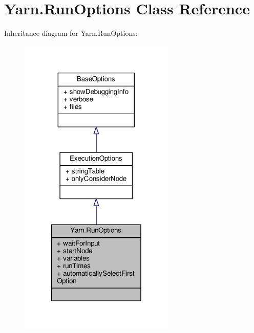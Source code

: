 \hypertarget{a00133}{\section{Yarn.\-Run\-Options Class Reference}
\label{a00133}
}


Inheritance diagram for Yarn.\-Run\-Options\-:
\nopagebreak
\begin{figure}[H]
\begin{center}
\leavevmode
\includegraphics[width=210pt]{d8/ddc/a00655}
\end{center}
\end{figure}


